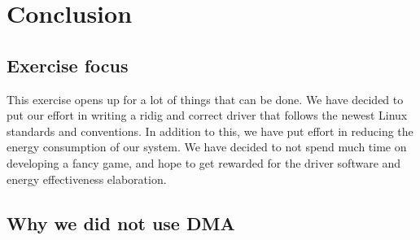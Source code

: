 \section{Conclusion}

\subsection{Exercise focus}
This exercise opens up for a lot of things that can be done. We have decided to put our effort in writing a ridig and correct driver that follows the newest Linux standards and conventions. In addition to this, we have put effort in reducing the energy consumption of our system. We have decided to not spend much time on developing a fancy game, and hope to get rewarded for the driver software and energy effectiveness elaboration. 


\subsection{Why we did not use DMA}
